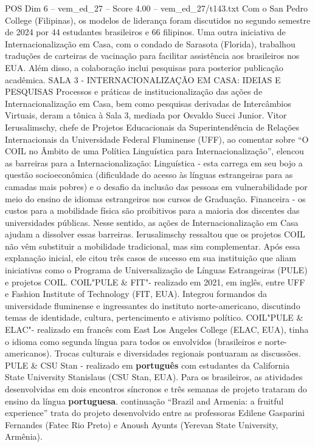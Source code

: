 \begin{textsample}{POS Dim 6 – vem\_ed\_27 – Score 4.00 – vem\_ed\_27/t143.txt}
Com o San Pedro College (Filipinas), os modelos de liderança foram discutidos no segundo semestre de 2024 por 44 estudantes brasileiros e 66 filipinos.
Uma outra iniciativa de Internacionalização em Casa, com o condado de Sarasota (Florida), trabalhou traduções de carteiras de vacinação para facilitar assistência aos brasileiros nos EUA.
Além disso, a colaboração inclui pesquisas para posterior publicação acadêmica.
SALA 3 - INTERNACIONALIZAÇÃO EM CASA: IDEIAS E PESQUISAS Processos e práticas de institucionalização das ações de Internacionalização em Casa, bem como pesquisas derivadas de Intercâmbios Virtuais, deram a tônica à Sala 3, mediada por Osvaldo Succi Junior.
Vitor Ierusalimschy, chefe de Projetos Educacionais da Superintendência de Relações Internacionais da Universidade Federal Fluminense (UFF), ao comentar sobre “O COIL no Âmbito de uma Política Linguística para Internacionalização”, elencou as barreiras para a Internacionalização: Linguística - esta carrega em seu bojo a questão socioeconômica (dificuldade do acesso às línguas estrangeiras para as camadas mais pobres) e o desafio da inclusão das pessoas em vulnerabilidade por meio do ensino de idiomas estrangeiros nos cursos de Graduação.
Financeira - os custos para a mobilidade física são proibitivos para a maioria dos discentes das universidades públicas.
Nesse sentido, as ações de Internacionalização em Casa ajudam a dissolver essas barreiras.
Ierusalimschy ressaltou que os projetos COIL não vêm substituir a mobilidade tradicional, mas sim complementar.
Após essa explanação inicial, ele citou três casos de sucesso em sua instituição que aliam iniciativas como o Programa de Universalização de Línguas Estrangeiras (PULE) e projetos COIL.
COIL"PULE \& FIT"- realizado em 2021, em inglês, entre UFF e Fashion Institute of Technology (FIT, EUA).
Integrou formandos da universidade fluminense e ingressantes do instituto norte-americano, discutindo temas de identidade, cultura, pertencimento e ativismo político.
COIL"PULE \& ELAC"- realizado em francês com East Los Angeles College (ELAC, EUA), tinha o idioma como segunda língua para todos os envolvidos (brasileiros e norte-americanos).
Trocas culturais e diversidades regionais pontuaram as discussões.
PULE \& CSU Stan - realizado em \textbf{português} com estudantes da California State University Stanislaus (CSU Stan, EUA).
Para os brasileiros, as atividades desenvolvidas em dois encontros síncronos e três semanas de projeto trataram do ensino da língua \textbf{portuguesa}. continuação “Brazil and Armenia: a fruitful experience” trata do projeto desenvolvido entre as professoras Edilene Gasparini Fernandes (Fatec Rio Preto) e Anoush Ayunts (Yerevan State University, Armênia).

\end{textsample}
